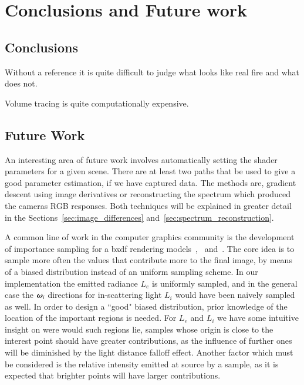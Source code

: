 \chapter{Conclusions and Future work}
\label{ch:conclusions}

\section{Conclusions}

Without a reference it is quite difficult to judge what looks like real fire and what does not.

Volume tracing is quite computationally expensive.

\section{Future Work}

An interesting area of future work involves automatically setting the shader parameters for a given scene.
There are at least two paths that be used to give a good parameter estimation, if we have captured data.
The methods are, gradient descent using image derivatives or reconstructing the spectrum which produced the cameras RGB responses.
Both techniques will be explained in greater detail in the Sections~\ref{sec:image_differences} and~\ref{sec:spectrum_reconstruction}.

A common line of work in the computer graphics community is the development of importance sampling for a bxdf rendering models~\cite{Lawrence:2004},~\cite{Ou:2012} and~\cite{Wang:2014}.
The core idea is to sample more often the values that contribute more to the final image, by means of a biased distribution instead of an uniform sampling scheme.
In our implementation the emitted radiance $L_e$ is uniformly sampled, and in the general case the $\boldsymbol{\omega}_i$ directions for in-scattering light $L_i$ would have been naively sampled as well.
In order to design a ``good" biased distribution, prior knowledge of the location of the important regions is needed. 
For $L_e$ and $L_i$ we have some intuitive insight on were would such regions lie, samples whose origin is close to the interest point should have greater contributions, as the influence of further ones will be diminished by the light distance falloff effect.
Another factor which must be considered is the relative intensity emitted at source by a sample, as it is expected that brighter points will have larger contributions. 

